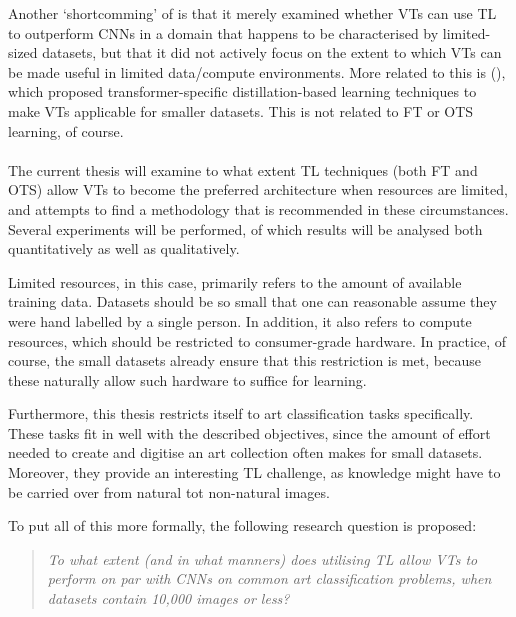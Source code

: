 Another `shortcomming' of \citeauthor{matsoukas2021time} is that it merely examined whether VTs can use TL to outperform CNNs in a domain that happens to be characterised by limited-sized datasets, but that it did not actively focus on the extent to which VTs can be made useful in limited data/compute environments. More related to this is \citeauthor{touvron2021training} (\citeyear{touvron2021training}), which proposed transformer-specific distillation-based learning techniques to make VTs applicable for smaller datasets. This is not related to FT or OTS learning, of course.
\\\\
The current thesis will examine to what extent TL techniques (both FT and OTS) allow VTs to become the preferred architecture when resources are limited, and attempts to find a methodology that is recommended in these circumstances. Several experiments will be performed, of which results will be analysed both quantitatively as well as qualitatively.

Limited resources, in this case, primarily refers to the amount of available training data. Datasets should be so small that one can reasonable assume they were hand labelled by a single person. In addition, it also refers to compute resources, which should be restricted to consumer-grade hardware. In practice, of course, the small datasets already ensure that this restriction is met, because these naturally allow such hardware to suffice for learning.

Furthermore, this thesis restricts itself to art classification tasks specifically. These tasks fit in well with the described objectives, since the amount of effort needed to create and digitise an art collection often makes for small datasets. Moreover, they provide an interesting TL challenge, as knowledge might have to be carried over from natural tot non-natural images.

To put all of this more formally, the following research question is proposed: \begin{quote}\textit{To what extent (and in what manners) does utilising TL allow VTs to perform on par with CNNs on common art classification problems, when datasets contain 10,000 images or less?}\end{quote}
